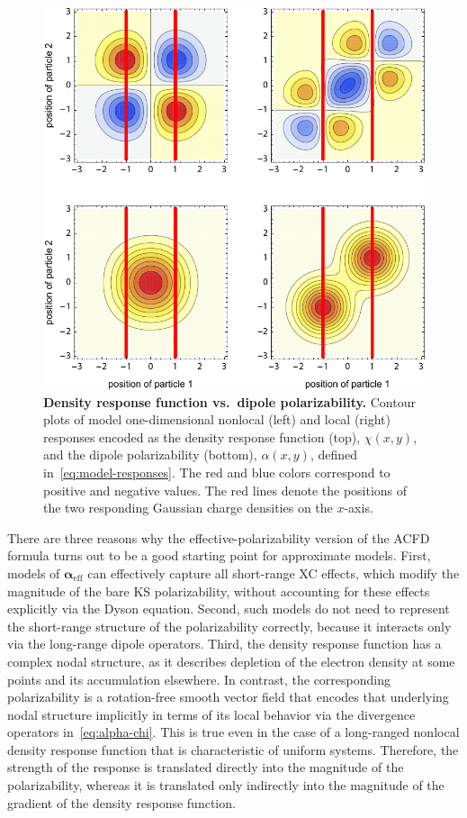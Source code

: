 \begin{figure}
\includegraphics[center]{media/chi-vs-alpha}
\caption{\textbf{Density response function vs.\ dipole polarizability.}
Contour plots of model one-dimensional nonlocal (left) and local (right) responses encoded as the density response function (top), $\chi(x,y)$, and the dipole polarizability (bottom), $\alpha(x,y)$, defined in~\eqref{eq:model-responses}.
The red and blue colors correspond to positive and negative values.
The red lines denote the positions of the two responding Gaussian charge densities on the $x$-axis.
}\label{fig:chi-vs-alpha}
\end{figure}

There are three reasons why the effective-polarizability version of the ACFD formula turns out to be a good starting point for approximate models.
First, models of $\boldsymbol\alpha_\text{eff}$ can effectively capture all short-range XC effects, which modify the magnitude of the bare KS polarizability, without accounting for these effects explicitly via the Dyson equation.
Second, such models do not need to represent the short-range structure of the polarizability correctly, because it interacts only via the long-range dipole operators.
Third, the density response function has a complex nodal structure, as it describes depletion of the electron density at some points and its accumulation elsewhere.
In contrast, the corresponding polarizability is a rotation-free smooth vector field that encodes that underlying nodal structure implicitly in terms of its local behavior via the divergence operators in~\eqref{eq:alpha-chi}.
This is true even in the case of a long-ranged nonlocal density response function that is characteristic of uniform systems.
Therefore, the strength of the response is translated directly into the magnitude of the polarizability, whereas it is translated only indirectly into the magnitude of the gradient of the density response function.

